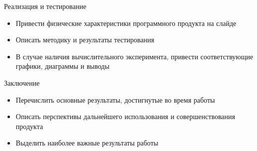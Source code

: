 \documentclass{../cls/fefu_presentation}
\begin{document}
    \begin{frame}{Реализация и тестирование}
        \begin{block}{}
            \begin{itemize}
                \item Привести физические характеристики программного продукта на слайде
                \item Описать методику и результаты тестирования
                \item В случае наличия вычислительного эксперимента, привести соответствующие графики, диаграммы и выводы
            \end{itemize}
        \end{block}
    \end{frame}


    \begin{frame}{Заключение}
        \begin{block}{}
            \begin{itemize}
                \item Перечислить основные результаты, достигнутые во время работы
                \item Описать перспективы дальнейшего использования и совершенствования продукта
                \item Выделить наиболее важные результаты работы
            \end{itemize}
        \end{block}
    \end{frame}

    
\end{document}
